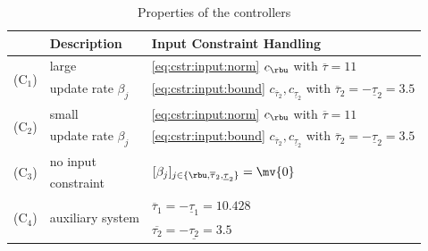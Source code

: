 \documentclass[journal]{IEEEtran}
\begin{document}
\begin{table}[t]
    \renewcommand{\arraystretch}{1.3}
    \caption{Properties of the controllers}
    \label{table:controller}
    \centering
    \begin{tabular}{c l l}
    \hline
        &\bf{Description}&\bf{Input Constraint Handling}\\
    \hline
    \hline
        \multirow{2}{*}{(C$_1$)}&large&\eqref{eq:cstr:input:norm} $c_{\rbu}$ with $\overline{\tau}=11$ \\
        &  update rate $\beta_j$ &\eqref{eq:cstr:input:bound} $c_{\overline\tau_2}, c_{\underline\tau_2}$ with $\overline{\tau}_2=-\underline{\tau}_2=3.5$ \\
    \hline
        \multirow{2}{*}{(C$_2$)}&small&\eqref{eq:cstr:input:norm} $c_{\rbu}$ with $\overline{\tau}=11$ \\
        &  update rate $\beta_j$ &\eqref{eq:cstr:input:bound} $c_{\overline\tau_2}, c_{\underline\tau_2}$ with $\overline{\tau}_2=-\underline{\tau}_2=3.5$ \\
    \hline
        \multirow{2}{*}{(C$_3$)}&no input& \multirow{2}{*}{$[\beta_j]_{j\in\{\rbu,\overline{\tau}_2,\underline{\tau}_2\}}=\mv{0}$} \\
        & constraint &  \\
    \hline
        \multirow{2}{*}{(C$_4$)}&\multirow{2}{*}{auxiliary system} & $\overline{\tau}_1=-\underline{\tau}_1=10.428$ \\
        &  & $\overline{\tau_2}=-\underline{\tau_2}=3.5$ \\    
    \hline
    \end{tabular}
    \label{table:controllers}
\end{table}
\end{document}
